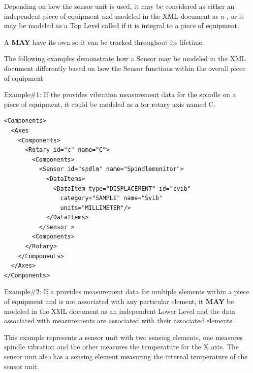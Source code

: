 Depending on how the \gls{sensor unit} is used, it may be considered as either an independent piece of equipment and modeled in the \gls{XML} document as a , or it may be modeled as a \gls{Top Level}  called  if it is integral to a piece of equipment.

A  \textbf{MAY} have its own  so it can be tracked throughout its lifetime.

The following examples demonstrate how a \gls{Sensor} may be modeled in the \gls{XML} document differently based on how the \gls{Sensor} functions within the overall piece of equipment

Example\#1:   If the  provides vibration measurement data for the spindle on a piece of equipment, it could be modeled as a  for rotary axis named C.

\begin{lstlisting}[firstnumber=1,escapechar=|,%
    caption={Example of Sensor for rotary axis}, label={lst:example-of-sensor}]
<Components>
  <Axes
    <Components>
      <Rotary id="c" name="C">
        <Components>
          <Sensor id="spdlm" name="Spindlemonitor">
            <DataItems>
              <DataItem type="DISPLACEMENT" id="cvib"
                category="SAMPLE" name="Svib" 
                units="MILLIMETER"/>
            </DataItems>
          </Sensor >
        <Components>
      </Rotary>
    </Components>
  </Axes>
</Components>
\end{lstlisting}

Example\#2:   If a  provides measurement data for multiple  elements within a piece of equipment and is not associated with any particular  element, it \textbf{MAY} be modeled in the \gls{XML} document as an independent \gls{Lower Level}  and the data associated with measurements are associated with their associated  elements.

This example represents a \gls{sensor unit} with two \glspl{sensing element}, one measures spindle vibration and the other measures the temperature for the X axis.   The \gls{sensor unit} also has a \gls{sensing element} measuring the internal temperature of the \gls{sensor unit}.

